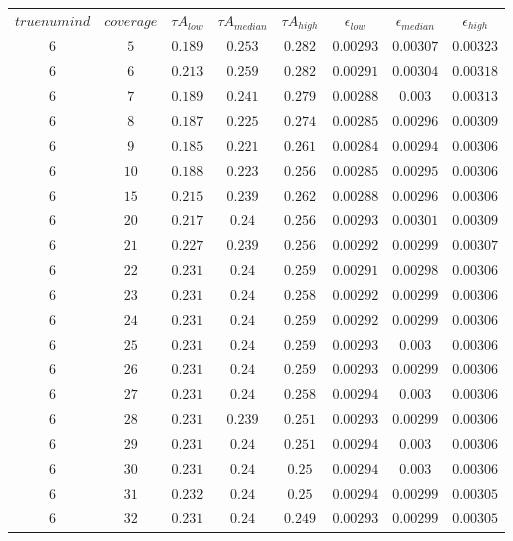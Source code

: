 \begin{table}[H]
\begin{tabular}{cccccccc}
$truenumind$ & $coverage$ & ${\tau}A_{low}$ & ${\tau}A_{median}$ & ${\tau}A_{high}$ & $\epsilon_{low}$ & $\epsilon_{median}$ & $\epsilon_{high}$\\
$6$ & $5$ & $0.189$ & $0.253$ & $0.282$ & $0.00293$ & $0.00307$ & $0.00323$\\
$6$ & $6$ & $0.213$ & $0.259$ & $0.282$ & $0.00291$ & $0.00304$ & $0.00318$\\
$6$ & $7$ & $0.189$ & $0.241$ & $0.279$ & $0.00288$ & $0.003$ & $0.00313$\\
$6$ & $8$ & $0.187$ & $0.225$ & $0.274$ & $0.00285$ & $0.00296$ & $0.00309$\\
$6$ & $9$ & $0.185$ & $0.221$ & $0.261$ & $0.00284$ & $0.00294$ & $0.00306$\\
$6$ & $10$ & $0.188$ & $0.223$ & $0.256$ & $0.00285$ & $0.00295$ & $0.00306$\\
$6$ & $15$ & $0.215$ & $0.239$ & $0.262$ & $0.00288$ & $0.00296$ & $0.00306$\\
$6$ & $20$ & $0.217$ & $0.24$ & $0.256$ & $0.00293$ & $0.00301$ & $0.00309$\\
$6$ & $21$ & $0.227$ & $0.239$ & $0.256$ & $0.00292$ & $0.00299$ & $0.00307$\\
$6$ & $22$ & $0.231$ & $0.24$ & $0.259$ & $0.00291$ & $0.00298$ & $0.00306$\\
$6$ & $23$ & $0.231$ & $0.24$ & $0.258$ & $0.00292$ & $0.00299$ & $0.00306$\\
$6$ & $24$ & $0.231$ & $0.24$ & $0.259$ & $0.00292$ & $0.00299$ & $0.00306$\\
$6$ & $25$ & $0.231$ & $0.24$ & $0.259$ & $0.00293$ & $0.003$ & $0.00306$\\
$6$ & $26$ & $0.231$ & $0.24$ & $0.259$ & $0.00293$ & $0.00299$ & $0.00306$\\
$6$ & $27$ & $0.231$ & $0.24$ & $0.258$ & $0.00294$ & $0.003$ & $0.00306$\\
$6$ & $28$ & $0.231$ & $0.239$ & $0.251$ & $0.00293$ & $0.00299$ & $0.00306$\\
$6$ & $29$ & $0.231$ & $0.24$ & $0.251$ & $0.00294$ & $0.003$ & $0.00306$\\
$6$ & $30$ & $0.231$ & $0.24$ & $0.25$ & $0.00294$ & $0.003$ & $0.00306$\\
$6$ & $31$ & $0.232$ & $0.24$ & $0.25$ & $0.00294$ & $0.00299$ & $0.00305$\\
$6$ & $32$ & $0.231$ & $0.24$ & $0.249$ & $0.00293$ & $0.00299$ & $0.00305$\\

\end{tabular}
\end{table}
